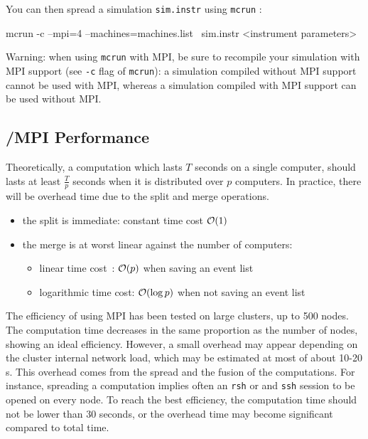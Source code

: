 You can then spread a simulation \verb'sim.instr' using \verb'mcrun' :
\begin{bash}
  mcrun -c --mpi=4 --machines=machines.list \
        sim.instr <instrument parameters>
\end{bash}

\begin{paragraph}{Warning:} when using \verb'mcrun' with MPI, be sure to
  recompile your simulation with MPI support (see \verb'-c' flag of
  \verb'mcrun'): a simulation compiled without MPI support cannot be used with
  MPI, whereas a simulation compiled with MPI support can be used without MPI.
\end{paragraph}

\subsection{\MCS/MPI Performance}

Theoretically, a computation which lasts $T$ seconds on a single computer,
should lasts at least $\frac{T}{p}$ seconds when it is distributed over $p$
computers. In practice, there will be overhead time due to the split and merge
operations.
\begin{itemize}
\item the split is immediate: constant time cost ${\cal O}(1)$
\item the merge is at worst linear against the number of computers:
  \begin{itemize}
  \item linear time cost~: ${\cal O}(p)$ when saving an event list
  \item logarithmic time cost: ${\cal O}(\log{p})$ when not saving an
  event list
  \end{itemize}
\end{itemize}

The efficiency of \MCS using MPI has been tested on large clusters, up to 500
nodes.  The computation time decreases in the same proportion as the number of
nodes, showing an ideal efficiency. However, a small overhead may appear
depending on the cluster internal network load, which may be estimated at most
of about 10-20 s.  This overhead comes from the spread and the fusion of the
computations. For instance, spreading a computation implies often an \verb'rsh'
or and \verb'ssh' session to be opened on every node.  To reach the best
efficiency, the computation time should not be lower than 30 seconds, or the
overhead time may become significant compared to total time.

